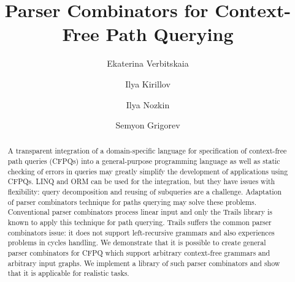 \documentclass[sigconf,screen]{acmart}
\begin{document}
\title{Parser Combinators for Context-Free Path Querying}


\author{Ekaterina Verbitskaia}

\author{Ilya Kirillov}

\author{Ilya Nozkin}


\author{Semyon Grigorev}

\renewcommand{\shortauthors}{Verbitskaia et al.}

\begin{abstract}
A transparent integration of a domain-specific language for specification of context-free path queries (CFPQs) into a general-purpose programming language as well as static checking of errors in queries may greatly simplify the development of applications using CFPQs.
LINQ and ORM can be used for the integration, but they have issues with flexibility: query decomposition and reusing of subqueries are a challenge.
Adaptation of parser combinators technique for paths querying may solve these problems.
Conventional parser combinators process linear input and only the Trails library is known to apply this technique for path querying.
Trails suffers the common parser combinators issue: it does not support left-recursive grammars and also experiences problems in cycles handling.
We demonstrate that it is possible to create general parser combinators for CFPQ which support arbitrary context-free grammars and arbitrary input graphs.
We implement a library of such parser combinators and show that it is applicable for realistic tasks.
\end{abstract}
\end{document}

